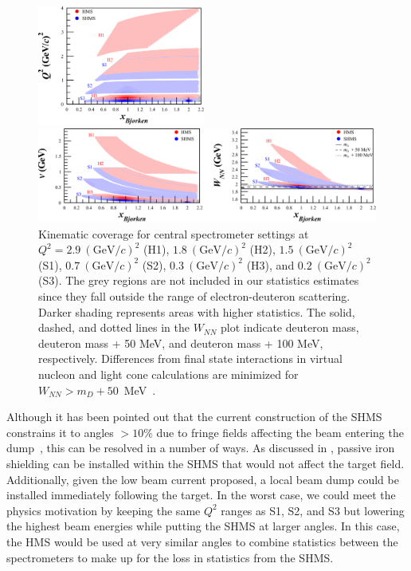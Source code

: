 \begin{figure}
\begin{center}
\includegraphics[width=0.49\textwidth]{figs/Pzz_30_all_q2.eps}

\includegraphics[width=\textwidth]{figs/Pzz_30_all_nu_wnn.eps}

\caption{\label{kincov} Kinematic coverage for central spectrometer settings at $Q^2=2.9~(\mathrm{GeV}/c)^2$ (H1), $1.8~(\mathrm{GeV}/c)^2$ (H2), $1.5~(\mathrm{GeV}/c)^2$ (S1), $0.7~(\mathrm{GeV}/c)^2$ (S2), $0.3~(\mathrm{GeV}/c)^2$ (H3), and $0.2~(\mathrm{GeV}/c)^2$ (S3). The grey regions are not included in our statistics estimates since they fall outside the range of electron-deuteron scattering. Darker shading represents areas with higher statistics. The solid, dashed, and dotted lines in the $W_{NN}$ plot indicate deuteron mass, deuteron mass + 50 MeV, and deuteron mass + 100 MeV, respectively. Differences from final state interactions in virtual nucleon and light cone calculations are minimized for $W_{NN}>m_D+50$~MeV~\cite{Frankfurt:1993sp}.}
\end{center}
\end{figure}

Although it has been pointed out that the current construction of the SHMS constrains it to angles $>10\%$ due to fringe fields affecting the beam entering the dump~\cite{Moore:2014sxa}, this can be resolved in a number of ways. As discussed in \cite{Moore:2014sxa}, passive iron shielding can be installed within the SHMS that would not affect the target field. Additionally, given the low beam current proposed, a local beam dump could be installed immediately following the target. In the worst case, we could meet the physics motivation by keeping the same $Q^2$ ranges as S1, S2, and S3 but lowering the highest beam energies while putting the SHMS at larger angles. In this case, the HMS would be used at very similar angles to combine statistics between the spectrometers to make up for the loss in statistics from the SHMS. 


